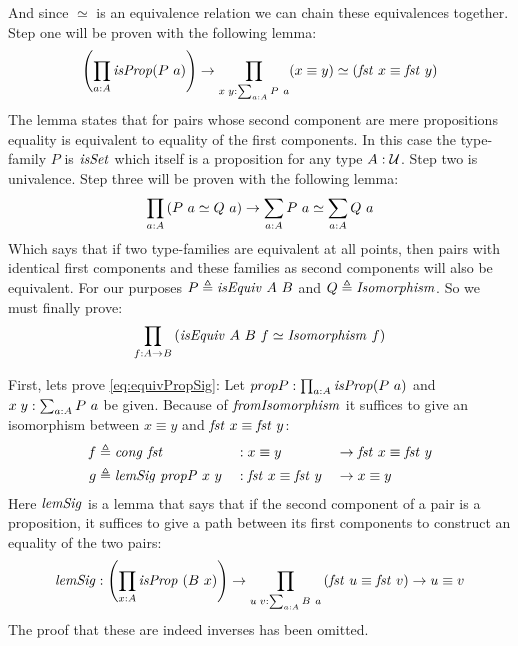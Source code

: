 And since $\simeq$ is an equivalence relation we can chain these equivalences
together. Step one will be proven with the following lemma:
%
\begin{align}
  \label{eq:equivPropSig}
\left(\prod_{a \mathrel{:} A} \mathit{isProp} (P\ a)\right) \to \prod_{x\;y \mathrel{:} \sum_{a \mathrel{:} A} P\ a} (x \equiv y) \simeq (\mathit{fst}\ x \equiv \mathit{fst}\ y)
\end{align}
%
The lemma states that for pairs whose second component are mere propositions
equality is equivalent to equality of the first components. In this case the
type-family $P$ is $\mathit{isSet}$ which itself is a proposition for any type $A \mathrel{:}
\mathcal{U}$. Step two is univalence. Step three will be proven with the following
lemma:
%
\begin{align}
  \label{eq:equivSig}
\prod_{a \mathrel{:} A} \left( P\ a \simeq Q\ a \right) \to \sum_{a \mathrel{:} A} P\ a \simeq \sum_{a \mathrel{:} A} Q\ a
\end{align}
%
Which says that if two type-families are equivalent at all points, then pairs
with identical first components and these families as second components will
also be equivalent. For our purposes $P \mathrel{\triangleq} \mathit{isEquiv}\ A\ B$ and $Q \mathrel{\triangleq}
\mathit{Isomorphism}$. So we must finally prove:
%
\begin{align}
  \label{eq:equivIso}
\prod_{f \tp A \to B} \left( \isEquiv\ A\ B\ f \simeq \var{Isomorphism}\ f \right)
\end{align}

First, lets prove \ref{eq:equivPropSig}: Let $propP \mathrel{:} \prod_{a \mathrel{:} A} \mathit{isProp} (P\ a)$ and $x\;y \mathrel{:} \sum_{a \mathrel{:} A} P\ a$ be given. Because
of $\mathit{fromIsomorphism}$ it suffices to give an isomorphism between
$x \equiv y$ and $\mathit{fst}\ x \equiv \mathit{fst}\ y$:
%
\begin{equation*}
\begin{aligned}
  f & \mathrel{\triangleq} \mathit{cong}\ \mathit{fst}
    && \mathrel{:} x       \equiv y       && \to \mathit{fst}\ x \equiv \mathit{fst}\ y \\
  g & \mathrel{\triangleq} \mathit{lemSig}\ \mathit{propP}\ x\ y
    && \mathrel{:} \mathit{fst}\ x \equiv \mathit{fst}\ y && \to x       \equiv y
\end{aligned}
\end{equation*}
%
 Here $\mathit{lemSig}$ is
a lemma that says that if the second component of a pair is a proposition, it
suffices to give a path between its first components to construct an equality of
the two pairs:
%
\begin{align*}
\mathit{lemSig} \mathrel{:} \left( \prod_{x \mathrel{:} A} \mathit{isProp}\ (B\ x) \right) \to
\prod_{u\; v \mathrel{:} \sum_{a \mathrel{:} A} B\ a}
  \left( \mathit{fst}\ u \equiv \mathit{fst}\ v \right) \to u \equiv v
\end{align*}
%
The proof that these are indeed inverses has been omitted. \QED

